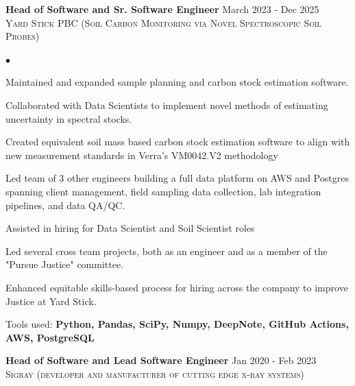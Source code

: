\documentclass{article}
\newcommand{\experience}[4]{{\vspace{0pt}\bf{#1}} \hfill  #2\\{\textsc{#3} \hfill \emph{#4}\\  }}
\newenvironment{achievements}{\begin{list}{$\bullet$}{\topsep 0pt \itemsep -2pt}}{\vspace*{4pt}\end{list}}
\begin{document}
\experience{Head of Software and Sr. Software Engineer}{March 2023 - Dec 2025}{Yard Stick PBC \textnormal{(Soil Carbon Monitoring via Novel Spectroscopic Soil Probes) }}{}

\begin{achievements}
   \item Maintained and expanded sample planning and carbon stock estimation software. 
   \item Collaborated with Data Scientists to implement novel methods of estimating uncertainty in spectral stocks. 
   \item Created equivalent soil mass based carbon stock estimation software to align with new measurement standards in Verra's VM0042.V2 methodology
    \item Led team of 3 other engineers building a full data platform on AWS and Postgres spanning client management, field sampling data collection, lab integration pipelines, and data QA/QC.
    \item Assisted in hiring for Data Scientist and Soil Scientist roles
    \item Led several cross team projects, both as an engineer and as a member of the "Pursue Justice" committee. 
    \item Enhanced equitable skills-based process for hiring across the company to improve Justice at Yard Stick. 
    \item Tools used: \bf{Python, Pandas, SciPy, Numpy, DeepNote, GitHub Actions, AWS, PostgreSQL}
\end{achievements}

\experience{Head of Software and Lead Software Engineer}{Jan 2020 - Feb 2023}{Sigray \textnormal{(developer and manufacturer of cutting edge x-ray systems) }}{}
\end{document}
